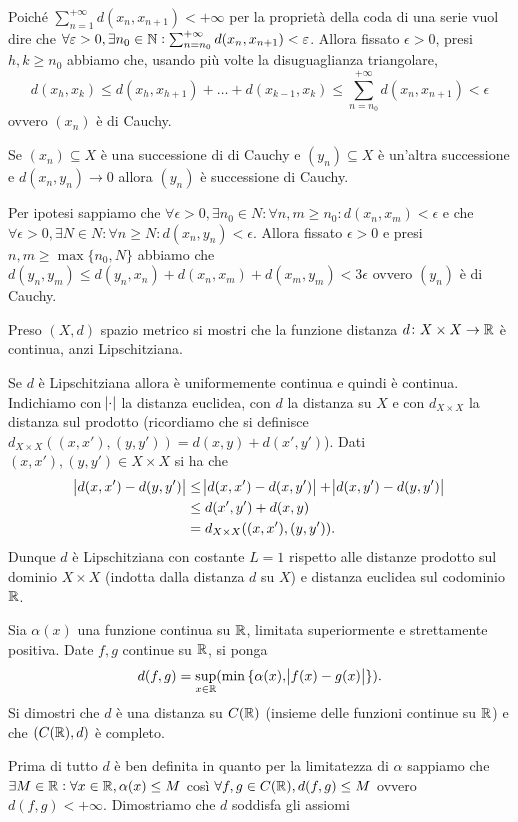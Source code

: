\documentclass[a4paper]{article}\par \usepackage{style}\par
\begin{document}
Poiché $ \sum_{n = 1}^{+\infty} d(x_n, x_{n + 1}) < +\infty $ per la proprietà della coda di una serie vuol dire che $ \forall \varepsilon > 0, \exists n_0 \in \mathbb{N} : \sum_{n = n_0}^{+\infty} d(x_n, x_{n + 1}) < \varepsilon $. Allora fissato $ \epsilon > 0 $, presi $ h, k \geq n_0 $ abbiamo che, usando più volte la disuguaglianza triangolare, \[d(x_h, x_k) \leq d(x_h, x_{h + 1}) + \ldots + d(x_{k - 1}, x_k) \leq \sum_{n = n_0}^{+\infty} d(x_n, x_{n + 1}) < \epsilon\] ovvero $ (x_n) $ è di Cauchy.\par \begin{es}
  Se $ (x_n) \subseteq X $ è una successione di di Cauchy e $ (y_n) \subseteq X $ è un'altra successione e $ d(x_n, y_n) \to 0 $ allora $ (y_n) $ è successione di Cauchy.
\end{es}\par Per ipotesi sappiamo che $ \forall \epsilon > 0, \exists n_0 \in N :  \forall n, m \geq n_0 : d(x_n, x_m) < \epsilon $ e che $ \forall \epsilon > 0, \exists N \in N :  \forall n \geq N : d(x_n, y_n) < \epsilon $. Allora fissato $ \epsilon > 0 $ e presi $ n, m \geq \max{\{n_0, N\}}$ abbiamo che $ d(y_n, y_m) \leq d(y_n, x_n) + d(x_n, x_m) + d(x_m, y_m) < 3\epsilon $ ovvero $ (y_n) $ è di Cauchy.\par \begin{es}
  Preso $ (X, d) $ spazio metrico si mostri che la funzione distanza $ d \colon X \times X \to \mathbb{R} $ è continua, anzi Lipschitziana.
\end{es}\par Se $ d $ è Lipschitziana allora è uniformemente continua e quindi è continua. Indichiamo con $ \abs{\cdot} $ la distanza euclidea, con $ d $ la distanza su $ X $ e con $ d_{X \times X} $ la distanza sul prodotto (ricordiamo che si definisce $ d_{X \times X}((x, x'),(y, y')) = d(x, y) + d(x', y') $). Dati $ (x, x'), (y, y') \in X \times X $ si ha che
\begin{align*}
  \abs{d(x, x') - d(y, y')} & \leq \abs{d(x, x') - d(x, y')} + \abs{d(x, y') - d(y, y')} \\
                            & \leq d(x', y') + d(x, y) \\
                            & = d_{X \times X}((x, x'),(y, y')).
\end{align*}
Dunque $ d $ è Lipschitziana con costante $ L = 1 $ rispetto alle distanze prodotto sul dominio $ X \times X $ (indotta dalla distanza $ d $ su $ X $) e distanza euclidea sul codominio $ \mathbb{R} $.\par \begin{es}
  Sia $ \alpha(x) $ una funzione continua su $ \mathbb{R} $, limitata superiormente e strettamente positiva. Date $ f, g $ continue su $ \mathbb{R} $, si ponga \[d(f, g) = \sup_{x \in \mathbb{R}}(\min{\{\alpha(x), \abs{f(x) - g(x)}\}}).\] Si dimostri che $ d $ è una distanza su $ C(\mathbb{R}) $ (insieme delle funzioni continue su $ \mathbb{R} $) e che $ (C(\mathbb{R}), d) $ è completo.
\end{es}\par Prima di tutto $ d $ è ben definita in quanto per la limitatezza di $ \alpha $ sappiamo che $ \exists M \in \mathbb{R} : \forall x \in \mathbb{R}, \alpha(x) \leq M $ così $ \forall f, g \in C(\mathbb{R}), d(f, g) \leq M $ ovvero $ d(f, g) < +\infty $. Dimostriamo che $ d $ soddisfa gli assiomi
\end{document}
